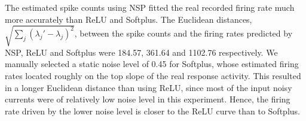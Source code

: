
	The estimated spike counts using NSP fitted the real recorded firing rate much more accurately than ReLU and Softplus.
	The Euclidean distances, $\sqrt{\sum_{j}(\lambda_j' - \lambda_j)^2}$, between the spike counts and the firing rates predicted by NSP, ReLU and Softplus were 184.57, 361.64 and 1102.76 respectively.
	We manually selected a static noise level of 0.45 for Softplus, whose estimated firing rates located roughly on the top slope of the real response activity.
	This resulted in a longer Euclidean distance than using ReLU, since most of the input noisy currents were of relatively low noise level in this experiment.
	Hence, the firing rate driven by the lower noise level is closer to the ReLU curve than to Softplus.

